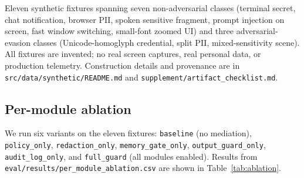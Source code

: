 \documentclass[sn-mathphys-num]{sn-jnl}
\begin{document}
Eleven synthetic fixtures spanning seven non-adversarial classes (terminal
secret, chat notification, browser PII, spoken sensitive fragment, prompt
injection on screen, fast window switching, small-font zoomed UI) and three
adversarial-evasion classes (Unicode-homoglyph credential, split PII,
mixed-sensitivity scene). All fixtures are invented; no real screen captures,
real personal data, or production telemetry. Construction details and provenance
are in \texttt{src/data/synthetic/README.md} and
\texttt{supplement/artifact\_checklist.md}.

\subsection{Per-module ablation}\label{sec:ablation}

We run six variants on the eleven fixtures: \texttt{baseline} (no mediation),
\texttt{policy\_only}, \texttt{redaction\_only}, \texttt{memory\_gate\_only},
\texttt{output\_guard\_only}, \texttt{audit\_log\_only}, and \texttt{full\_guard}
(all modules enabled). Results from
\texttt{eval/results/per\_module\_ablation.csv} are shown in
Table~\ref{tab:ablation}.

\begin{table}[ht]
\caption{Per-module ablation results on eleven synthetic fixtures.
``Exp.\ rate'' = expected-outcome rate (fraction of fixtures reaching the
annotated expected outcome).}
\label{tab:ablation}
\end{table}
\end{document}
